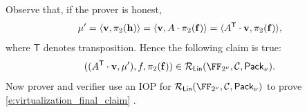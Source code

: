 \documentclass[11pt,letterpaper,usenames,dvipsnames]{article}
\begin{document}
\begin{construction}
\begin{enumerate}[leftmargin=*]
Observe that, if the prover is honest,
%
$$
\mu'=\langle \mathbf{v}, \pi_2(\mathbf{h})\rangle = \langle \mathbf{v}, A\cdot \pi_2(\mathbf{f}) \rangle = \langle A^{\mathsf{T}}\cdot \mathbf{v}, \pi_2(\mathbf{f})\rangle,
$$
%
where $\mathsf{T}$ denotes transposition. Hence the following claim is true:
%
\begin{equation}\label{e:virtualization_final_claim}
((\Mmatrix^{\mathsf{T}}\cdot \vv, \mu'), f, \pi_2(\bff)) \in \LIN(\comfield, \cC, \pack).
\end{equation}
%
Now prover and verifier use an IOP for $\LIN(\comfield, \cC, \pack)$ to prove \eqref{e:virtualization_final_claim} . 
\end{enumerate}
%
\end{construction}

\begin{remark}
\end{remark}
\end{document}
